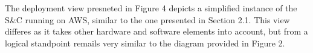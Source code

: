 The deployment view presneted in Figure 4 depicts a simplified instance of the S\&C running on AWS, similar to the one presented in Section 2.1. This view differes as it takes other hardware and software elements into account, but from a logical standpoint remails very similar to the diagram provided in Figure 2. 

